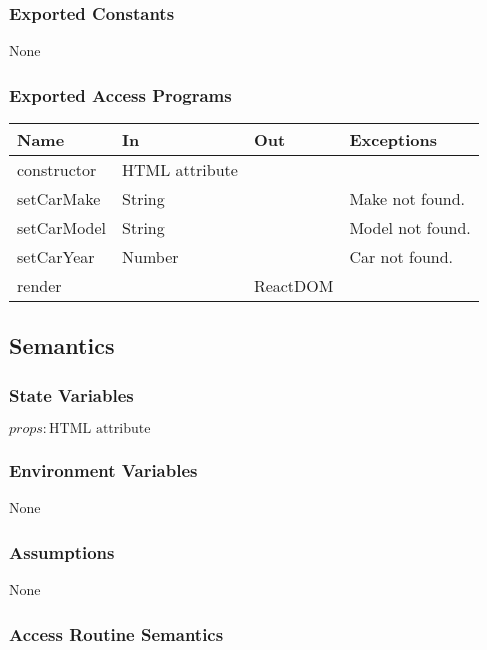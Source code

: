 \documentclass[12pt, titlepage]{article}
\begin{document}
\subsubsection{Exported Constants}

None

\subsubsection{Exported Access Programs}

\begin{tabular}{| l | l | l | l |}
  \hline
  \textbf{Name} & \textbf{In} & \textbf{Out} & \textbf{Exceptions}\\
  \hline
  constructor & HTML attribute & ~ & ~\\
  \hline
  setCarMake & String & ~ & Make not found.\\
  \hline
  setCarModel & String & ~ & Model not found.\\
  \hline
  setCarYear & Number & ~ & Car not found.\\
  \hline
  render & ~ & ReactDOM & ~\\
  \hline
\end{tabular}

\subsection{Semantics}

\subsubsection{State Variables}

$\mathit{props}: \text{HTML attribute}$\\

\subsubsection{Environment Variables}

None

\subsubsection{Assumptions}

None

\subsubsection{Access Routine Semantics}
\end{document}
